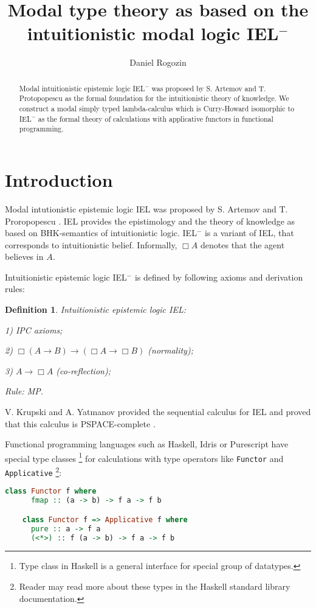 \documentclass[a4paper]{article}
\date{}
\author[1]{Daniel Rogozin}
\affil[1]{Moscow State University, Moscow, Russia}
\affil[1]{Serokell O\"{U}, Tallinn, Estonia}
\title{Modal type theory as based on the intuitionistic modal logic IEL$^{-}$}
\newtheorem{defin}{Definition}
\begin{document}
\maketitle

\begin{abstract}
Modal intuitionistic epistemic logic IEL$^{-}$ was proposed by S. Artemov and T. Protopopescu as the formal
foundation for the intuitionistic theory of knowledge. We construct a modal simply typed lambda-calculus
which is Curry-Howard isomorphic to IEL$^{-}$ as the formal theory of calculations with applicative functors in
functional programming.
\end{abstract}


  \section{Introduction}

  Modal intutionistic epistemic logic IEL was proposed by S. Artemov and T. Proropopescu \cite{Artemov}. IEL
  provides the epistimology and the theory of knowledge as based on BHK-semantics of intuitionistic logic.
  IEL$^{-}$  is a variant of IEL, that corresponds to intuitionistic belief.
  Informally, $\Box A$ denotes that the agent believes in $A$.

  Intuitionistic epistemic logic IEL$^{-}$ is defined by following axioms and derivation rules:

  \begin{defin} Intuitionistic epistemic logic IEL:

    1) IPC axioms;

    2) $\Box (A \to B) \to (\Box A \to \Box B)$ (normality);

    3) $A \to \Box A$ (co-reflection);

    Rule: MP.

  \end{defin}

  V. Krupski and  A. Yatmanov provided the sequential calculus for IEL and proved that this calculus is
  PSPACE-complete \cite{Krupski}.

  Functional programming languages such as Haskell, Idris or Purescript
  have special type classes \footnote{Type class in Haskell is a general interface for
  special group of datatypes.} for calculations with type operators like \verb"Functor" and
  \verb"Applicative" \footnote{Reader may read more about these types in the Haskell standard library documentation.}:

  \begin{lstlisting}[language=Haskell]
    class Functor f where
      fmap :: (a -> b) -> f a -> f b

    class Functor f => Applicative f where
      pure :: a -> f a
      (<*>) :: f (a -> b) -> f a -> f b
  \end{lstlisting}
\end{document}
